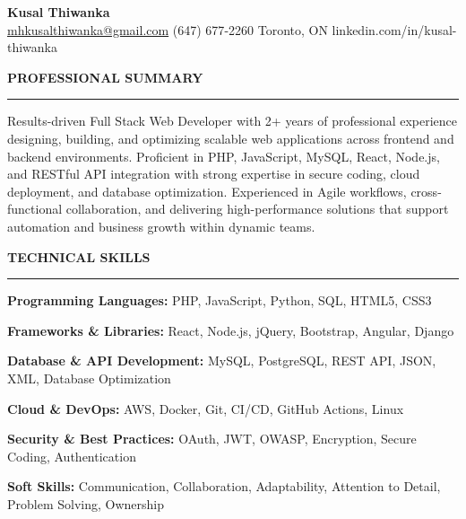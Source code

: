 \documentclass[10pt,letterpaper]{article}
\begin{document}
\begin{center}
{\LARGE\textbf{Kusal Thiwanka}}\\[3pt]
\href{mailto:mhkusalthiwanka@gmail.com}{mhkusalthiwanka@gmail.com}\hspace{2em}%
(647) 677{-}2260\hspace{2em}%
Toronto, ON\hspace{2em}
linkedin.com/in/kusal-thiwanka
\end{center}

\vspace{6pt}

\textbf{PROFESSIONAL SUMMARY}\\[-8pt]
\noindent\rule{\textwidth}{1pt}

\vspace{-2pt}

Results-driven Full Stack Web Developer with 2+ years of professional experience designing, building, and optimizing scalable web applications across frontend and backend environments. Proficient in PHP, JavaScript, MySQL, React, Node.js, and RESTful API integration with strong expertise in secure coding, cloud deployment, and database optimization. Experienced in Agile workflows, cross-functional collaboration, and delivering high-performance solutions that support automation and business growth within dynamic teams.

\vspace{8pt}

\textbf{TECHNICAL SKILLS}\\[-8pt]
\noindent\rule{\textwidth}{1pt}

\vspace{-2pt}

\textbf{Programming Languages:} PHP, JavaScript, Python, SQL, HTML5, CSS3

\textbf{Frameworks \& Libraries:} React, Node.js, jQuery, Bootstrap, Angular, Django

\textbf{Database \& API Development:} MySQL, PostgreSQL, REST API, JSON, XML, Database Optimization

\textbf{Cloud \& DevOps:} AWS, Docker, Git, CI/CD, GitHub Actions, Linux

\textbf{Security \& Best Practices:} OAuth, JWT, OWASP, Encryption, Secure Coding, Authentication

\textbf{Soft Skills:} Communication, Collaboration, Adaptability, Attention to Detail, Problem Solving, Ownership

\vspace{8pt}
\end{document}
